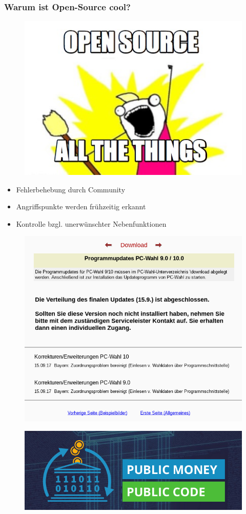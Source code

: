 \begin{frame}
	\frametitle{Warum ist Open-Source cool?}
	\begin{figure}
		\includegraphics[scale=0.4]{resources/att.jpg}
	\end{figure}
	\begin{itemize}
		\item Fehlerbehebung durch Community
		\item Angriffspunkte werden frühzeitig erkannt
		\item Kontrolle bzgl. unerwünschter Nebenfunktionen
	\end{itemize}
\end{frame}

\begin{frame}
	\begin{figure}
		\includegraphics[scale=0.4]{resources/pcwahl10.png}
	\end{figure}
\end{frame}

\begin{frame}
	\begin{figure}
		\includegraphics[scale=0.45]{resources/pmpc.png}
	\end{figure}
\end{frame}